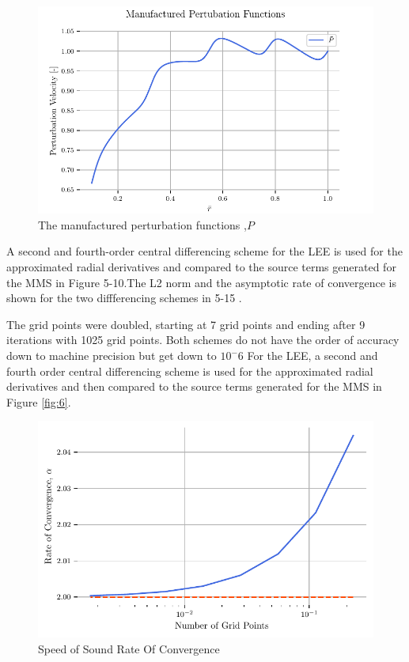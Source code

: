 \begin{figure}[h!]
    \centering
    \includegraphics{../../../CodeRun/04-plotReport/tex-outputs/MMS1_perturbation_variables_Pr.pdf}
\caption{The manufactured perturbation functions ,$P$}%
    \label{fig:4a}
\end{figure}



A second and fourth-order central differencing scheme for the LEE is used for 
the approximated radial derivatives and compared to the source terms generated 
for the MMS in Figure 5-10.The L2 norm and the asymptotic rate of convergence 
is shown for the two diffferencing schemes in 5-15 . 

The grid points were doubled, starting at 7 grid points and ending after 9 iterations with 1025 grid points. Both schemes do not have the order of accuracy down to machine precision but get down to $10^-6$
For the LEE, a second and fourth order central differencing scheme is used
for the approximated radial derivatives and then compared to the source terms 
generated for the MMS in Figure \ref{fig:6}. 
\begin{figure}[h!]
    \centering
    \includegraphics{../../../CodeRun/04-plotReport/tex-outputs/MMS1_SpeedOfSoundComparisonROC.pdf}
    \caption{ Speed of Sound Rate Of Convergence}
    \label{fig:SpeedOfSoundROC}
\end{figure}

